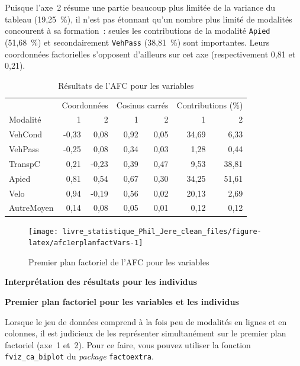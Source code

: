 \documentclass[
  11pt,
  french,
]{book}
\makeatletter
\newenvironment{kframev}{%
\medskip{}
\setlength{\fboxsep}{.8em}
 \def\at@end@of@kframev{}%
 \ifinner\ifhmode%
  \def\at@end@of@kframev{\end{minipage}}%
  \begin{minipage}{\columnwidth}%
 \fi\fi%
 \def\FrameCommand##1{\hskip\@totalleftmargin \hskip-\fboxsep
 \colorbox{shadebluecolor}{##1}\hskip-\fboxsep
     \hskip-\linewidth \hskip-\@totalleftmargin \hskip\columnwidth}%
 \MakeFramed {\advance\hsize-\width
   \@totalleftmargin\z@ \linewidth\hsize
   \@setminipage}}%
 {\par\unskip\endMakeFramed%
 \at@end@of@kframev}
\newenvironment{rmdblock}[1]
  {
  \begin{itemize}
  \renewcommand{\labelitemi}{
    \raisebox{-.7\height}[0pt][0pt]{
      {\setkeys{Gin}{width=3em,keepaspectratio}\texttt{[image: images/\#1]}}
    }
  }
  \setlength{\fboxsep}{1em}
  \begin{kframev}
  \small
  \item
  }
  {
  \end{kframev}
  \end{itemize}
  }
\newenvironment{bloc_notes}
  {\begin{rmdblock}{notes}}
  {\end{rmdblock}}
\makeatother
\begin{document}
Puisque l'axe~2 résume une partie beaucoup plus limitée de la variance du tableau (19,25~\%), il n'est pas étonnant qu'un nombre plus limité de modalités concourent à sa formation~: seules les contributions de la modalité \texttt{Apied} (51,68~\%) et secondairement \texttt{VehPass} (38,81~\%) sont importantes. Leurs coordonnées factorielles s'opposent d'ailleurs sur cet axe (respectivement 0,81 et 0,21).

\begin{table}

\caption{\label{tab:dataafcCoordVars}Résultats de l'AFC pour les variables}
\centering
\fontsize{8}{10}\selectfont
\begin{tabular}[t]{lrrrrrr}
\toprule
\multicolumn{1}{c}{ } & \multicolumn{2}{c}{Coordonnées} & \multicolumn{2}{c}{Cosinus carrés} & \multicolumn{2}{c}{Contributions (\%)} \\
\cmidrule(l{3pt}r{3pt}){2-3} \cmidrule(l{3pt}r{3pt}){4-5} \cmidrule(l{3pt}r{3pt}){6-7}
Modalité & 1 & 2 & 1 & 2 & 1 & 2\\
\midrule
VehCond & -0,33 & 0,08 & 0,92 & 0,05 & 34,69 & 6,33\\
VehPass & -0,25 & 0,08 & 0,34 & 0,03 & 1,28 & 0,44\\
TranspC & 0,21 & -0,23 & 0,39 & 0,47 & 9,53 & 38,81\\
Apied & 0,81 & 0,54 & 0,67 & 0,30 & 34,25 & 51,61\\
Velo & 0,94 & -0,19 & 0,56 & 0,02 & 20,13 & 2,69\\
\addlinespace
AutreMoyen & 0,14 & 0,08 & 0,05 & 0,01 & 0,12 & 0,12\\
\bottomrule
\end{tabular}
\end{table}

\begin{figure}

{\centering \texttt{[image: livre\_statistique\_Phil\_Jere\_clean\_files/figure-latex/afc1erplanfactVars-1]} 

}

\caption{Premier plan factoriel de l'AFC pour les variables}\label{fig:afc1erplanfactVars}
\end{figure}

\textbf{Interprétation des résultats pour les individus}

\begin{bloc_notes}
\textbf{Premier plan factoriel pour les variables et les individus}

Lorsque le jeu de données comprend à la fois peu de modalités en lignes et en colonnes, il est judicieux de les représenter simultanément sur le premier plan factoriel (axe~1 et~2). Pour ce faire, vous pouvez utiliser la fonction \texttt{fviz\_ca\_biplot} du \emph{package} \texttt{factoextra}.

\end{bloc_notes}
\end{document}

